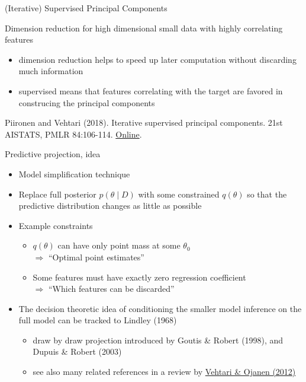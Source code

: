 \documentclass[english,t]{beamer}
\renewcommand{\emph}[1]{\textcolor{navyblue}{#1}}
\begin{document}
\begin{frame}{}

  {\Large\color{navyblue} (Iterative) Supervised Principal Components}

  \begin{itemize}
  \item Dimension reduction for high dimensional small data with
    highly correlating features
    \begin{itemize}
    \item dimension reduction helps to speed up later computation
      without discarding much information
    \item supervised means that features correlating with the target
      are favored in construcing the principal components
    \end{itemize}
    {\small
    \item     Piironen and Vehtari (2018). Iterative supervised principal components. 21st AISTATS, PMLR 84:106-114. \href{http://proceedings.mlr.press/v84/piironen18a.html}{Online}.
    }
  \end{itemize}
  
\end{frame}

\begin{frame}{}

  {\Large\color{navyblue} Predictive projection, idea}
  
  \begin{itemize}
  \item Model simplification technique
  \item<2-> Replace full posterior $p(\theta \mid D)$ with
    some constrained $q(\theta)$ so that the \emph{predictive
      distribution} changes as little as possible
  \item<3-> Example constraints
    \begin{itemize}
    \item $q(\theta)$ can have only point mass at some $\theta_0$ \\
      $\Rightarrow$ ``Optimal point estimates''
    \item<4-> Some features must have exactly zero regression coefficient \\
      $\Rightarrow$ ``Which features can be discarded''
    \end{itemize}
    \vspace{1\baselineskip}
  \item<5-> The decision theoretic idea of conditioning the smaller
    model inference on the full model can be tracked to Lindley (1968)
    \begin{itemize}
    \item draw by draw projection introduced by Goutis \& Robert
      (1998), and Dupuis \& Robert (2003)
    \item see also many related references in a review by
      \href{http://dx.doi.org/10.1214/12-SS102}{Vehtari \& Ojanen
        (2012)}
    \end{itemize}
\end{itemize}

\end{frame}
\end{document}
